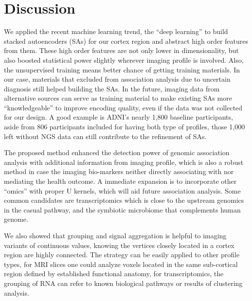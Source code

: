 \section{Discussion}
We applied the recent machine learning trend, the ``deep learning'' to build stacked autoencoders (SAs) for our cortex region and abstract high order features from them. These high order features are not only lower in dimensionality, but also boosted statistical power slightly wherever imaging profile is involved. Also, the unsupervised training means better chance of getting training materials. In our case, materials that excluded from association analysis due to uncertain diagnosis still helped building the SAs. In the future, imaging data from alternative sources can serve as training material to make existing SAs more ``knowledgeable'' to improve encoding quality, even if the data was not collected for our design. A good example is ADNI's nearly 1,800 baseline participants, aside from $806$ participants included for having both type of profiles, those 1,000 left without NGS data can still contribute to the refinement of SAs.

The proposed method enhanced the detection power of genomic association analysis with additional information from imaging profile, which is also a robust method in case the imaging bio-markers neither directly associating with nor mediating the health outcome. A immediate expansion is to incorporate other ``omics'' with proper U kernels, which will aid future association analysis. Some common candidates are transcriptomics which is close to the upstream genomics in the casual pathway, and the symbiotic microbiome that complements human genome.

We also showed that grouping and signal aggregation is helpful to imaging variants of continuous values, knowing the vertices closely located in a cortex region are highly connected. The strategy can be easily applied to other profile types, for MRI slices one could analyze voxels located in the same sub-cortical region defined by established functional anatomy, for transcriptomics, the grouping of RNA can refer to known biological pathways or results of clustering analysis. 

